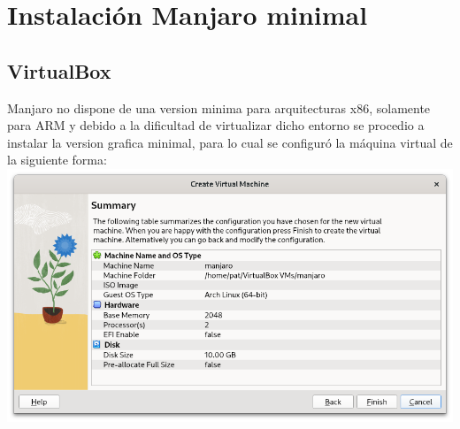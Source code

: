 \documentclass{article}
\begin{document}
\section{Instalación Manjaro minimal}
    \subsection{VirtualBox}
    Manjaro no dispone de una version minima para arquitecturas x86, solamente para ARM y debido a la dificultad de virtualizar dicho entorno se procedio a instalar la version grafica minimal, para lo cual se configuró la máquina virtual de la siguiente forma:
        \\ 
        \includegraphics[scale=0.5]{vm/init.png}
        
\newpage
\end{document}
